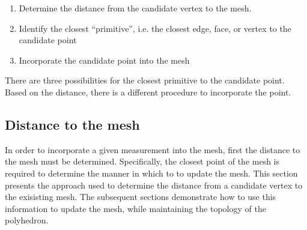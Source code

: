 \begin{enumerate}
    \item Determine the distance from the candidate vertex to the mesh.
    \item Identify the closest ``primitive'', i.e. the closest edge, face, or vertex to the candidate point
    \item Incorporate the candidate point into the mesh
\end{enumerate}

There are three possibilities for the closest primitive to the candidate point. 
Based on the distance, there is a different procedure to incorporate the point.

\subsection{Distance to the mesh}

In order to incorporate a given measurement into the mesh, first the distance to the mesh must be determined.
Specifically, the closest point of the mesh is required to determine the manner in which to to update the mesh.
This section presents the approach used to determine the distance from a candidate vertex to the exisisting mesh. 
The subsequent sections demonstrate how to use this information to update the mesh, while maintaining the topology of the polyhedron.

